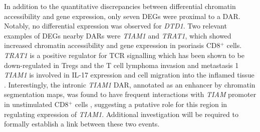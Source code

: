 

In addition to the quantitative discrepancies between differential chromatin accessibility and gene expression, only seven DEGs were proximal to a DAR. Notably, no differential expression was observed for \textit{DTD1}. Two relevant examples of DEGs nearby DARs were \textit{TIAM1} and \textit{TRAT1}, which showed increased chromatin accessibility and gene expression in psoriasis CD8$^+$ cells. \textit{TRAT1} is a positive regulator for TCR signalling which has been shown to be down-regulated in Tregs \parencite{Birzele2011} and the T cell lymphoma invasion and metastasis 1 \textit{TIAM1} is involved in IL-17 expression and cell migration into the inflamed tissue \parencite{Kurdi2016, Gerard2009}. Interestingly, the intronic \textit{TIAM1} DAR, annotated as an enhancer by chromatin segmentation maps, was found to have frequent interactions with \textit{TIAM} promoter in unstimulated CD8$^+$ cells \parencite{Javierre2016}, suggesting a putative role for this region in regulating expression of \textit{TIAM1}. Additional investigation will be required to formally establish a link between these two events.



